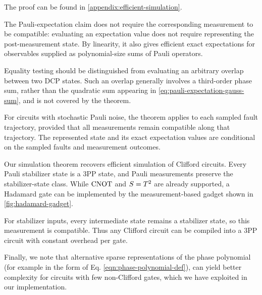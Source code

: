 \begin{theorem}
\label{thm:efficient-simulation}
\efficientSimulationStatement{\label{eq:simulation-representation}}
\end{theorem}
The proof can be found in \cref{appendix:efficient-simulation}.

The Pauli-expectation claim does not require the
corresponding measurement to be compatible: evaluating
an expectation value does not require representing the
post-measurement state. By linearity, it also gives
efficient exact expectations for observables supplied
as polynomial-size sums of Pauli operators.

Equality testing should be distinguished from evaluating
an arbitrary overlap between two DCP states. Such an
overlap generally involves a third-order phase sum,
rather than the quadratic sum appearing in
\cref{eq:pauli-expectation-gauss-sum}, and is not
covered by the theorem.

For circuits with stochastic Pauli noise, the theorem
applies to each sampled fault trajectory, provided that
all measurements remain compatible along that trajectory.
The represented state and its exact expectation values
are conditional on the sampled faults and measurement
outcomes.

Our simulation theorem recovers efficient simulation of Clifford circuits. Every Pauli stabilizer state is a 3PP state, and Pauli measurements preserve the stabilizer-state class. While $\operatorname{CNOT}$ and $S=T^2$ are already supported, a Hadamard gate can be implemented by the measurement-based gadget shown in \cref{fig:hadamard-gadget}.

For stabilizer inputs, every intermediate state remains a stabilizer state, so this measurement is compatible. Thus any Clifford circuit can be compiled into a 3PP circuit with constant overhead per gate.

Finally, we note that alternative sparse representations of the phase polynomial (for example in the form of Eq. \eqref{eqn:phase-polynomial-def}), can yield better complexity for circuits with few non-Clifford gates, which we have exploited in our implementation.
